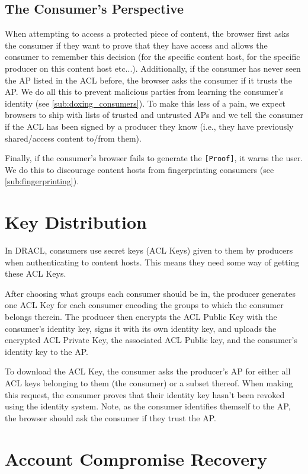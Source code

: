 \documentclass[pdftex,12pt,a4papaer,twoside,notitlepage]{report}
\begin{document}
\subsection{The Consumer's Perspective}
\label{sec:consumer_perspective}

When attempting to access a protected piece of content, the browser first asks
the consumer if they want to prove that they have access and allows the consumer
to remember this decision (for the specific content host, for the specific
producer on this content host etc...). Additionally, if the consumer has never
seen the AP listed in the ACL before, the browser asks the consumer if it trusts
the AP. We do all this to prevent malicious parties from learning the consumer's
identity (see \cref{sub:doxing_consumers}). To make this less of a pain, we
expect browsers to ship with lists of trusted and untrusted APs and we tell the
consumer if the ACL has been signed by a producer they know (i.e., they have
previously shared/access content to/from them).

Finally, if the consumer's browser fails to generate the \verb=[Proof]=, it
warns the user. We do this to discourage content hosts from fingerprinting
consumers (see \cref{sub:fingerprinting}).

\section{Key Distribution}

In DRACL, consumers use secret keys (ACL Keys) given to them by producers when
authenticating to content hosts. This means they need some way of getting these
ACL Keys.

After choosing what groups each consumer should be in, the producer generates
one ACL Key for each consumer encoding the groups to which the consumer belongs
therein. The producer then encrypts the ACL Public Key with the consumer's
identity key, signs it with its own identity key, and uploads the encrypted ACL
Private Key, the associated ACL Public key, and the consumer's identity key to
the AP.

To download the ACL Key, the consumer asks the producer's AP for either all ACL
keys belonging to them (the consumer) or a subset thereof. When making this
request, the consumer proves that their identity key hasn't been revoked using
the identity system. Note, as the consumer identifies themself to the AP, the
browser should ask the consumer if they trust the AP.

\section{Account Compromise Recovery}
\label{sec:revoke}
\end{document}
